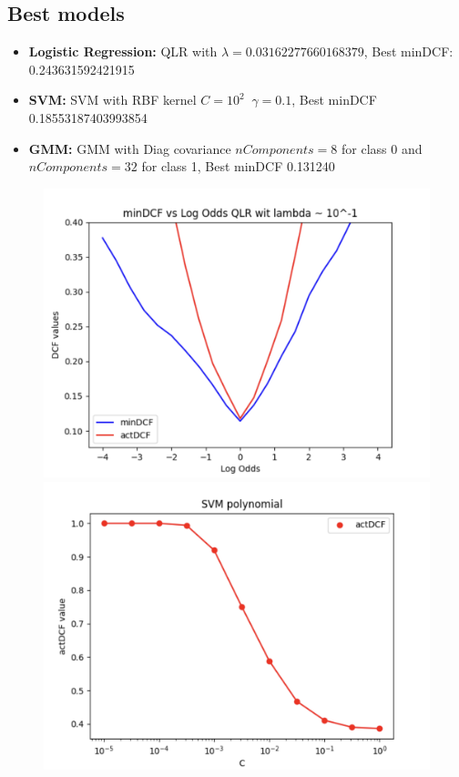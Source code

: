 \documentclass{article}
\begin{document}
\subsection*{Best models}
\begin{itemize}
    \item \textbf{Logistic Regression:} QLR with \(\lambda=0.03162277660168379\), Best minDCF: 0.243631592421915
    \item \textbf{SVM:} SVM with RBF kernel \(C=10^2\;\; \gamma=0.1\), Best minDCF  0.18553187403993854
    \item \textbf{GMM:} GMM with Diag covariance \(nComponents=8\) for class 0 and \(nComponents=32\) for class 1, Best minDCF 0.131240
\end{itemize}
\begin{figure}[H]
    \centering
    \begin{minipage}{.3\textwidth}
        \centering
        \includegraphics[width=\linewidth]{./img/BestQLR.png}
    \end{minipage}%
    \begin{minipage}{.3\textwidth}
        \centering
        \includegraphics[width=\linewidth]{./img/SVM_P2.png}

\end{minipage}
\end{figure}
\end{document}
